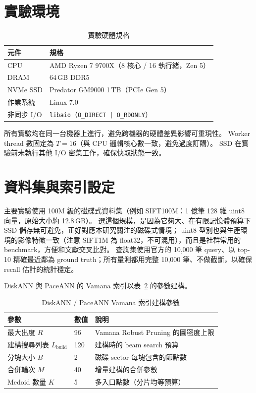 \section{實驗環境}
\label{sec:testbed}

\begin{table}[h]
\centering
\caption{實驗硬體規格}
\label{tab:hardware}
\begin{tabular}{ll}
\toprule
元件 & 規格 \\
\midrule
CPU & AMD Ryzen 7 9700X（8 核心 / 16 執行緒，Zen 5） \\
DRAM & 64\,GB DDR5 \\
NVMe SSD & Predator GM9000 1\,TB（PCIe Gen 5） \\
作業系統 & Linux 7.0 \\
非同步 I/O & \texttt{libaio}（\texttt{O\_DIRECT | O\_RDONLY}） \\
\bottomrule
\end{tabular}
\end{table}

所有實驗均在同一台機器上進行，避免跨機器的硬體差異影響可重現性。
Worker thread 數固定為 $T = 16$（與 CPU 邏輯核心數一致，避免過度訂購）。
SSD 在實驗前未執行其他 I/O 密集工作，確保快取狀態一致。

\section{資料集與索引設定}
\label{sec:dataset}

主要實驗使用 100M 級的磁碟式資料集（例如 SIFT100M：1 億筆 128 維 uint8 向量，原始大小約 12.8\,GB）。
選這個規模，是因為它夠大、在有限記憶體預算下 SSD 儲存無可避免，正好對應本研究關注的磁碟式情境；
uint8 型別也與生產環境的影像特徵一致（注意 SIFT1M 為 float32，不可混用），而且是社群常用的 benchmark，方便和文獻交叉比對。
查詢集使用官方的 10,000 筆 query、以 top-10 精確最近鄰為 ground truth；所有量測都用完整 10,000 筆、不做截斷，以確保 recall 估計的統計穩定。

DiskANN 與 PaceANN 的 Vamana 索引以表~\ref{tab:index-build} 的參數建構。

\begin{table}[h]
\centering
\caption{DiskANN / PaceANN Vamana 索引建構參數}
\label{tab:index-build}
\begin{tabular}{lll}
\toprule
參數 & 數值 & 說明 \\
\midrule
最大出度 $R$ & 96 & Vamana Robust Pruning 的圖密度上限 \\
建構搜尋列表 $L_\text{build}$ & 120 & 建構時的 beam search 預算 \\
分塊大小 $B$ & 2 & 磁碟 sector 每塊包含的節點數 \\
合併輪次 $M$ & 40 & 增量建構的合併參數 \\
Medoid 數量 $K$ & 5 & 多入口點數（分片均等預算） \\
\bottomrule
\end{tabular}
\end{table}

